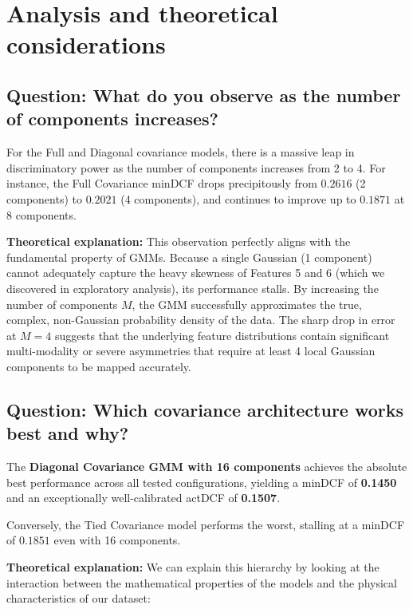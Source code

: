 \section{Analysis and theoretical considerations}

\subsection*{Question: What do you observe as the number of components increases?}

For the Full and Diagonal covariance models, there is a massive leap in discriminatory power as the number of components increases from 2 to 4. For instance, the Full Covariance minDCF drops precipitously from $0.2616$ (2 components) to $0.2021$ (4 components), and continues to improve up to $0.1871$ at 8 components. 

\textbf{Theoretical explanation:} This observation perfectly aligns with the fundamental property of GMMs. Because a single Gaussian (1 component) cannot adequately capture the heavy skewness of Features 5 and 6 (which we discovered in exploratory analysis), its performance stalls. By increasing the number of components $M$, the GMM successfully approximates the true, complex, non-Gaussian probability density of the data. The sharp drop in error at $M=4$ suggests that the underlying feature distributions contain significant multi-modality or severe asymmetries that require at least 4 local Gaussian components to be mapped accurately.

\subsection*{Question: Which covariance architecture works best and why?}

The \textbf{Diagonal Covariance GMM with 16 components} achieves the absolute best performance across all tested configurations, yielding a minDCF of \textbf{0.1450} and an exceptionally well-calibrated actDCF of \textbf{0.1507}. 

Conversely, the Tied Covariance model performs the worst, stalling at a minDCF of $0.1851$ even with 16 components. 

\textbf{Theoretical explanation:} We can explain this hierarchy by looking at the interaction between the mathematical properties of the models and the physical characteristics of our dataset:

